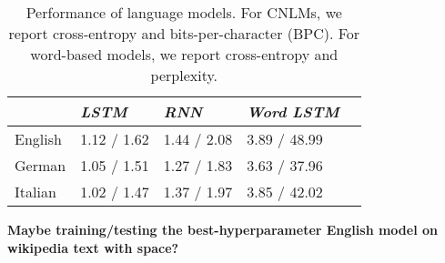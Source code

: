 \begin{table}[t]
  \begin{center}
    \begin{tabular}{l|l|l|l|l}
      \multicolumn{1}{c}{}&\emph{LSTM}&\emph{RNN}&\emph{Word LSTM}\\
      \hline
	    English & 1.12 / 1.62 & 1.44 / 2.08 & 3.89 / 48.99  \\
	    German &  1.05 / 1.51 & 1.27 / 1.83 & 3.63 / 37.96   \\
	    Italian & 1.02 / 1.47 & 1.37 / 1.97 & 3.85 / 42.02  \\
    \end{tabular}
  \end{center}
  \caption{\label{tab:lm-results} Performance of language models. For CNLMs, we report cross-entropy and bits-per-character (BPC). For word-based models, we report cross-entropy and perplexity.}
\end{table}

\textbf{Maybe training/testing the best-hyperparameter English model
  on wikipedia text with space?}


